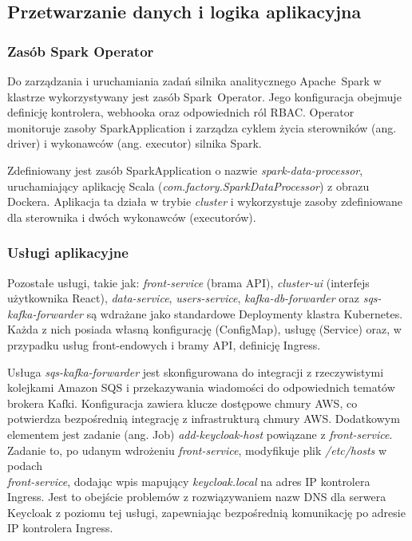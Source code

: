 \subsection{Przetwarzanie danych i logika aplikacyjna}

\subsubsection{Zasób Spark Operator}
Do zarządzania i uruchamiania zadań silnika analitycznego \mbox{Apache Spark} w klastrze wykorzystywany jest zasób \mbox{Spark Operator}. Jego konfiguracja obejmuje definicję kontrolera, webhooka oraz odpowiednich ról RBAC. Operator monitoruje zasoby \mbox{SparkApplication} i zarządza cyklem życia sterowników (ang. driver) i wykonawców (ang. executor) silnika Spark.

Zdefiniowany jest zasób SparkApplication o nazwie \textit{spark-data-processor}, uruchamiający aplikację Scala (\textit{com.factory.SparkDataProcessor}) z obrazu Dockera. Aplikacja ta działa w trybie \textit{cluster} i wykorzystuje zasoby zdefiniowane dla sterownika i dwóch wykonawców (executorów).

\subsubsection{Usługi aplikacyjne}
Pozostałe usługi, takie jak: \textit{front-service} (brama API), \textit{cluster-ui} (interfejs użytkownika React), \textit{data-service}, \textit{users-service}, \textit{kafka-db-forwarder} oraz \textit{sqs-kafka-forwarder} są wdrażane jako standardowe Deploymenty klastra Kubernetes. Każda z nich posiada własną konfigurację (ConfigMap), usługę (Service) oraz, w przypadku usług front-endowych i bramy API, definicję Ingress.

Usługa \textit{sqs-kafka-forwarder} jest skonfigurowana do integracji z rzeczywistymi kolejkami Amazon SQS i przekazywania wiadomości do odpowiednich tematów brokera Kafki. Konfiguracja zawiera klucze dostępowe chmury AWS, co potwierdza bezpośrednią integrację z infrastrukturą chmury AWS.
\newpage
Dodatkowym elementem jest zadanie (ang. Job) \textit{add-keycloak-host} powiązane z \textit{front-service}. Zadanie to, po udanym wdrożeniu \textit{front-service}, modyfikuje plik \textit{/etc/hosts} w podach \\ \textit{front-service}, dodając wpis mapujący \textit{keycloak.local} na adres IP kontrolera Ingress. Jest to obejście problemów z rozwiązywaniem nazw DNS dla serwera Keycloak z poziomu tej usługi, zapewniając bezpośrednią komunikację po adresie IP kontrolera Ingress.

